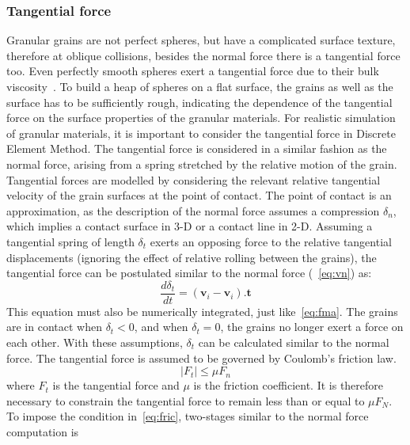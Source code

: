 \subsubsection*{Tangential force}
Granular grains are not perfect spheres, but have a complicated surface 
texture, therefore at 
oblique collisions, besides the normal force there is a tangential force too. 
Even perfectly 
smooth 
spheres exert a tangential force due to their bulk viscosity~\citep{Posch2005}. 
To build a heap of 
spheres on a flat surface, the grains as well as the surface has to be 
sufficiently rough, 
indicating the dependence of the tangential force on the surface properties of 
the granular 
materials. For realistic simulation of granular materials, it is important to 
consider the 
tangential force in Discrete Element Method. The tangential force is considered 
in a similar 
fashion as the normal force, arising from a spring stretched by the relative 
motion of the grain. 
Tangential forces are modelled by considering the relevant relative tangential 
velocity of the 
grain surfaces at the point of contact. The point of contact is an 
approximation, as the 
description of the normal force assumes a compression $\delta_{n}$, which 
implies a contact 
surface 
in 3-D or a contact line in 2-D. Assuming a tangential spring of length 
$\delta_{t}$ exerts an 
opposing force to the relative tangential displacements (ignoring the effect of 
relative rolling 
between the grains), the tangential force can be postulated similar to the 
normal force 
(~\cref{eq:vn}) as:
\begin{equation}
\label{eq:vt}
\frac{d{\delta_{t}}}{dt}=(\mathbf{v}_{\mathit{i}}-\mathbf{v}_{\mathit{i}}).{\mathbf{t}}
\end{equation}
This equation must also be numerically integrated, just like~\cref{eq:fma}. The 
grains are in 
contact when $\delta_{t}<0$, and when $\delta_{t}=0$, the grains no longer 
exert a force on each 
other. With these assumptions, $\delta_{t}$ can be calculated similar to the 
normal force. The 
tangential force is assumed to be governed by Coulomb's friction law.
\begin{equation}
\left|F_{\mathit{t}}\right|\le\mu F_{\mathit{n}} \label{eq:fric}
\end{equation}
where $F_{\mathit{t}}$ is the tangential force and $\mu$ is the friction 
coefficient. It is 
therefore necessary to constrain the tangential force to remain less than or 
equal to $\mu F_{N}$. 
To impose the condition in~\cref{eq:fric}, two-stages similar to the normal 
force computation is 
